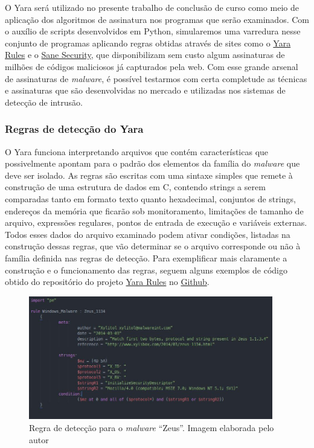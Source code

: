 O Yara será utilizado no presente trabalho de conclusão de curso como meio de
aplicação dos algoritmos de assinatura nos programas que serão examinados. Com
o auxílio de scripts desenvolvidos em Python, simularemos uma varredura nesse
conjunto de programas aplicando regras obtidas através de sites como o
\href{yararules.org}{Yara Rules} e o
\href{http://sanesecurity.com/usage/signatures/}{Sane Security}, que
disponibilizam sem custo algum assinaturas de milhões de códigos maliciosos já
capturados pela web. Com esse grande arsenal de assinaturas de \textit{malware}, é
possível testarmos com certa completude as técnicas e assinaturas que são
desenvolvidas no mercado e utilizadas nos sistemas de detecção de intrusão.

\subsubsection{Regras de detecção do Yara}
\label{l.regrasdyara}
O Yara funciona interpretando arquivos que contém características que possivelmente
apontam para o padrão dos elementos da família do \textit{malware} que deve ser
isolado. As regras são escritas com uma sintaxe simples que remete à
construção de uma estrutura de dados em C, contendo strings a serem comparadas
tanto em formato texto quanto hexadecimal, conjuntos de strings, endereços da
memória que ficarão sob monitoramento, limitações de tamanho de arquivo,
expressões regulares, pontos de entrada de execução e variáveis externas.
Todos esses dados do arquivo examinado podem ativar condições, listadas na
construção dessas regras, que vão determinar se o arquivo corresponde ou não à
família definida nas regras de detecção. Para exemplificar mais claramente a
construção e o funcionamento das regras, seguem alguns exemplos de código
obtido do repositório do projeto \href{yararules.org}{Yara Rules} no
\href{github.com}{Github}.

\begin{figure}[h]
	\centering
	\includegraphics[width=0.95\textwidth]{figs/zeus}
	\caption{Regra de detecção para o \textit{malware} ``Zeus''. Imagem elaborada pelo autor}
	\label{fig:label}
\end{figure}

